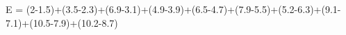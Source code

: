 \documentclass[preview]{standalone}
\begin{document}
\begin{center}
E = (2-1.5)+(3.5-2.3)+(6.9-3.1)+(4.9-3.9)+(6.5-4.7)+(7.9-5.5)+(5.2-6.3)+(9.1-7.1)+(10.5-7.9)+(10.2-8.7)
\end{center}
\end{document}
